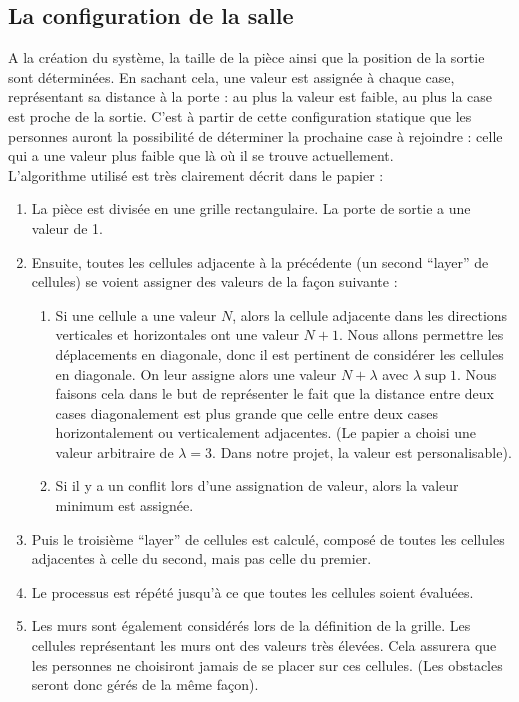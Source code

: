 	\subsection{La configuration de la salle}
	A la création du système, la taille de la pièce ainsi que la position de la sortie sont déterminées. En sachant cela, une valeur est assignée à chaque case, représentant sa distance à la porte : au plus la valeur est faible, au plus la case est proche de la sortie. C'est à partir de cette configuration statique que les personnes auront la possibilité de déterminer la prochaine case à rejoindre : celle qui a une valeur plus faible que là où il se trouve actuellement. \\
	L'algorithme utilisé est très clairement décrit dans le papier :
	\begin{enumerate}
	\item La pièce est divisée en une grille rectangulaire. La porte de sortie a une valeur de 1.
	\item Ensuite, toutes les cellules adjacente à la précédente (un second ``layer'' de cellules) se voient assigner des valeurs de la façon suivante :
		\begin{enumerate}
			\item Si une cellule a une valeur $N$, alors la cellule adjacente dans les directions verticales et horizontales ont une valeur $N + 1$. Nous allons permettre les déplacements en diagonale, donc il est pertinent de considérer les cellules en diagonale. On leur assigne alors une valeur $N + \lambda$ avec $\lambda \sup 1$. Nous faisons cela dans le but de représenter le fait que la distance entre deux cases diagonalement est plus grande que celle entre deux cases horizontalement ou verticalement adjacentes. (Le papier a choisi une valeur arbitraire de $\lambda = 3$. Dans notre projet, la valeur est personalisable).
			\item Si il y a un conflit lors d'une assignation de valeur, alors la valeur minimum est assignée.
		\end{enumerate}

		\item Puis le troisième ``layer'' de cellules est calculé, composé de toutes les cellules adjacentes à celle du second, mais pas celle du premier.
		\item Le processus est répété jusqu'à ce que toutes les cellules soient évaluées.
		\item Les murs sont également considérés lors de la définition de la grille. Les cellules représentant les murs ont des valeurs très élevées. Cela assurera que les personnes ne choisiront jamais de se placer sur ces cellules. (Les obstacles seront donc gérés de la même façon).
	\end{enumerate} 
